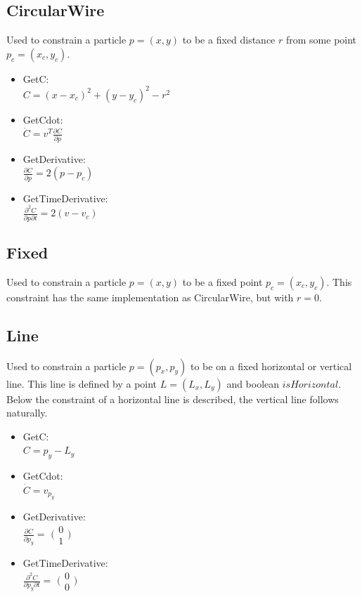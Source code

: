 \subsection{CircularWire}
Used to constrain a particle $p = (x, y)$ to be a fixed distance $r$ from some point $p_c = (x_c, y_c)$.
\begin{itemize}
  \item GetC:\\
   $C = (x - x_c)^2 + (y - y_c)^2 - r^2$
  \item GetCdot:\\
    $\dot{C} = {v}^T \frac{\partial C}{\partial p}$
  \item GetDerivative:\\
    $\frac{\partial C}{\partial p} = 2 (p - p_c)$
  \item GetTimeDerivative:\\
    $\frac{\partial^2 C}{\partial p \partial t} = 2 (v - v_c)$
\end{itemize}

\subsection{Fixed}
Used to constrain a particle $p = (x, y)$ to be a fixed point $p_c = (x_c, y_c)$.
This constraint has the same implementation as CircularWire, but with $r = 0$.

\subsection{Line}
Used to constrain a particle $p = (p_x, p_y)$ to be on a fixed horizontal or vertical line.
This line is defined by a point $L = (L_x, L_y)$ and boolean $isHorizontal$.
Below the constraint of a horizontal line is described, the vertical line follows naturally.
\begin{itemize}
  \item GetC:\\
   $C = p_y - L_y$
  \item GetCdot:\\
    $\dot{C} = v_{p_y}$
  \item GetDerivative:\\
    $\frac{\partial C}{\partial p_y} = $
    $\bigl(\begin{smallmatrix}
    0\\ 1
    \end{smallmatrix} \bigr)$
  \item GetTimeDerivative:\\
    $\frac{\partial^2 C}{\partial p_y \partial t} = $
    $\bigl(\begin{smallmatrix}
    0\\ 0
    \end{smallmatrix} \bigr)$
\end{itemize}



